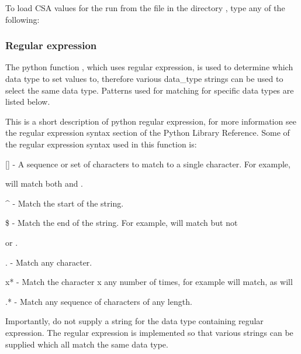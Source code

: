 To load CSA values for the run 
 from the file 
 in the directory 
, type
any of the following:








\subsubsection{Regular expression}

The python function 
, which uses regular expression, is used to determine which data
type to set values to, therefore various data\_type strings can be used to select the same
data type.  Patterns used for matching for specific data types are listed below.

This is a short description of python regular expression, for more information see the
regular expression syntax section of the Python Library Reference.  Some of the regular
expression syntax used in this function is:

    [] - A sequence or set of characters to match to a single character.  For example,
    
 will match both 
 and 
.

    \^{} - Match the start of the string.

    \$ - Match the end of the string.  For example, 
 will match 
 but not 

    or 
.

    . - Match any character.

    x* - Match the character x any number of times, for example 
 will match, as will
    


    .* - Match any sequence of characters of any length.

Importantly, do not supply a string for the data type containing regular expression.  The
regular expression is implemented so that various strings can be supplied which all match
the same data type.


